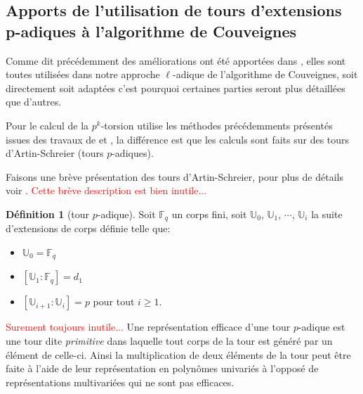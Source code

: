 \documentclass[10pt,a4paper]{book}
\theoremstyle{plain}
\theoremstyle{definition}
\theoremstyle{definition}
\theoremstyle{definition}
\theoremstyle{definition}
\newtheorem{defi}[thm]{Définition}
\theoremstyle{remark}
\theoremstyle{remark}
\theoremstyle{definition}
\begin{document}
\subsection{Apports de l'utilisation de tours d'extensions p-adiques à l'algorithme de Couveignes}

Comme dit précédemment des améliorations ont été apportées dans \cite{DeFeo11}, elles sont toutes utilisées dans notre approche $\ell$-adique de l'algorithme de Couveignes, soit directement soit adaptées c'est pourquoi certaines parties seront plus détaillées que d'autres.

Pour le calcul de la $p^k$-torsion \cite{DeFeo11} utilise les méthodes précédemments présentés issues des travaux de \cite{Gunji76} et \cite{Voloch90}, la différence est que les calculs sont faits sur des tours d'Artin-Schreier (tours $p$-adiques).

Faisons une brève présentation des tours d'Artin-Schreier, pour plus de détails voir \cite{DeFeo-Shost'12}.
\textcolor{red}{Cette brève description est bien inutile...}
\begin{defi}[tour $p$-adique]
Soit $\mathbb{F}_q$ un corps fini, soit $\mathbb{U}_0$, $\mathbb{U}_1$, $\cdots$, $\mathbb{U}_i$ la suite d'extensions de corps définie telle que:
\begin{itemize}
\item $\mathbb{U}_0=\mathbb{F}_q$
\item $[\mathbb{U}_1 : \mathbb{F}_q]= d_1$
\item $[\mathbb{U}_{i+1} :\mathbb{U}_i]= p$ pour tout $i \geqslant 1$.
\end{itemize}
\end{defi}
\textcolor{red}{Surement toujours inutile...}
Une représentation efficace d'une tour $p$-adique est une tour dite \emph{primitive} dans laquelle tout corps de la tour est généré par un élément de celle-ci. Ainsi la multiplication de deux éléments de la tour peut être faite à l'aide de leur représentation en polynômes univariés à l'opposé de représentations multivariées qui ne sont pas efficaces.
\end{document}
